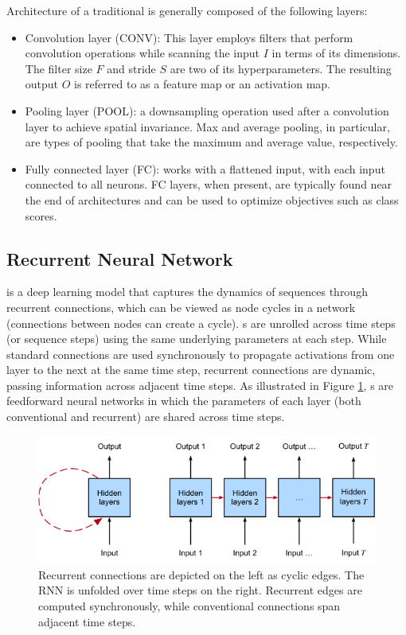 Architecture of a traditional  is generally composed of the following layers:
\begin{itemize}
    \item[] Convolution layer (CONV): This layer employs filters that perform convolution operations while scanning the input $I$ in terms of its dimensions. 
    The filter size $F$ and stride $S$ are two of its hyperparameters. 
    The resulting output $O$ is referred to as a feature map or an activation map.
    \item[] Pooling layer (POOL): a downsampling operation used after a convolution layer to achieve spatial invariance. 
    Max and average pooling, in particular, are types of pooling that take the maximum and average value, respectively.
    \item[] Fully connected layer (FC): works with a flattened input, with each input connected to all neurons. 
    FC layers, when present, are typically found near the end of  architectures and can be used to optimize objectives such as class scores.
\end{itemize}


\subsection{Recurrent Neural Network}

 is a deep learning model that captures the dynamics of sequences through recurrent connections, which can be viewed as node cycles in a network (connections between nodes can create a cycle).
s are unrolled across time steps (or sequence steps) using the same underlying parameters at each step. 
While standard connections are used synchronously to propagate activations from one layer to the next at the same time step, recurrent connections are dynamic, passing information across adjacent time steps.
As illustrated in Figure \ref{rnn}, s are feedforward neural networks in which the parameters of each layer (both conventional and recurrent) are shared across time steps.

\begin{figure}[!h]
    \centering
    \includegraphics[width=1.0\textwidth]{figures/unfolded-rnn.png}
    \caption{Recurrent connections are depicted on the left as cyclic edges. The RNN is unfolded over time steps on the right. Recurrent edges are computed synchronously, while conventional connections span adjacent time steps. \cite{zhang2021dive}}
    \label{rnn}
\end{figure}


